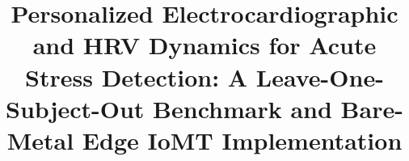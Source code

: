 \documentclass[conference]{IEEEtran}
\begin{document}
\title{Personalized Electrocardiographic and HRV Dynamics for Acute Stress Detection: A Leave-One-Subject-Out Benchmark and Bare-Metal Edge IoMT Implementation}

\author{
}

\maketitle

\begin{abstract}

\end{abstract}
\end{document}
